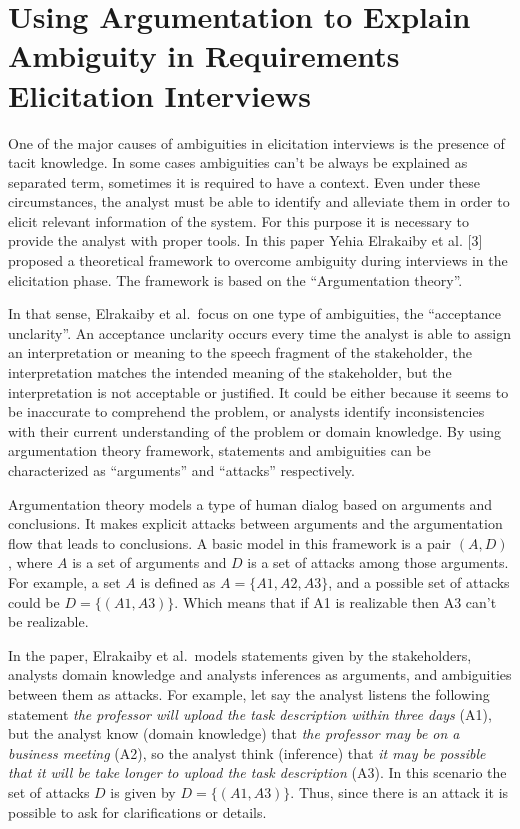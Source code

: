 \documentclass[]{llncs}
\begin{document}
\hypertarget{using-argumentation-to-explain-ambiguity-in-requirements-elicitation-interviews}{%
\section{Using Argumentation to Explain Ambiguity in Requirements
Elicitation
Interviews}\label{using-argumentation-to-explain-ambiguity-in-requirements-elicitation-interviews}}

One of the major causes of ambiguities in elicitation interviews is the
presence of tacit knowledge. In some cases ambiguities can't be always
be explained as separated term, sometimes it is required to have a
context. Even under these circumstances, the analyst must be able to
identify and alleviate them in order to elicit relevant information of
the system. For this purpose it is necessary to provide the analyst with
proper tools. In this paper Yehia Elrakaiby et al. {[}3{]} proposed a
theoretical framework to overcome ambiguity during interviews in the
elicitation phase. The framework is based on the ``Argumentation
theory''.

In that sense, Elrakaiby et al.~focus on one type of ambiguities, the
``acceptance unclarity''. An acceptance unclarity occurs every time the
analyst is able to assign an interpretation or meaning to the speech
fragment of the stakeholder, the interpretation matches the intended
meaning of the stakeholder, but the interpretation is not acceptable or
justified. It could be either because it seems to be inaccurate to
comprehend the problem, or analysts identify inconsistencies with their
current understanding of the problem or domain knowledge. By using
argumentation theory framework, statements and ambiguities can be
characterized as ``arguments'' and ``attacks'' respectively.

Argumentation theory models a type of human dialog based on arguments
and conclusions. It makes explicit attacks between arguments and the
argumentation flow that leads to conclusions. A basic model in this
framework is a pair \((A,D)\), where \(A\) is a set of arguments and
\(D\) is a set of attacks among those arguments. For example, a set
\(A\) is defined as \(A = \{A1,A2,A3\}\), and a possible set of attacks
could be \(D = \{(A1,A3)\}\). Which means that if A1 is realizable then
A3 can't be realizable.

In the paper, Elrakaiby et al.~models statements given by the
stakeholders, analysts domain knowledge and analysts inferences as
arguments, and ambiguities between them as attacks. For example, let say
the analyst listens the following statement \emph{the professor will
upload the task description within three days} (A1), but the analyst
know (domain knowledge) that \emph{the professor may be on a business
meeting} (A2), so the analyst think (inference) that \emph{it may be
possible that it will be take longer to upload the task description}
(A3). In this scenario the set of attacks \(D\) is given by
\(D = \{(A1,A3)\}\). Thus, since there is an attack it is possible to
ask for clarifications or details.
\end{document}
